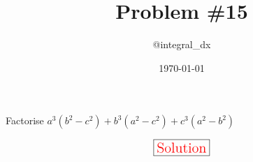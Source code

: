 \documentclass[usenames,dvipsnames]{article}
\title{Problem \#15}
\author{@integral\_dx}
\date{\today}
\begin{document}
\maketitle

Factorise $a^3(b^2 - c^2) + b^3(a^2 - c^2) + c^3(a^2 - b^2)$

\Large{}
$$\boxed{\mbox{\Large{\color{red}\text{Solution}}}}$$
\end{document}

